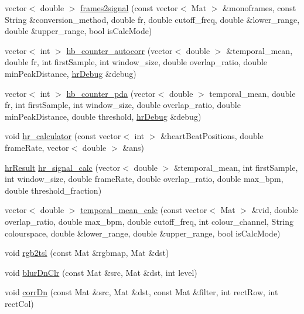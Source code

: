 \begin{DoxyCompactItemize}
\item 
vector$<$ double $>$ \hyperlink{namespace_m_h_r_a53c0c282e2b27534f2726f735f9664e3}{frames2signal} (const vector$<$ Mat $>$ \&monoframes, const String \&conversion\+\_\+method, double fr, double cutoff\+\_\+freq, double \&lower\+\_\+range, double \&upper\+\_\+range, bool is\+Calc\+Mode)
\item 
vector$<$ int $>$ \hyperlink{namespace_m_h_r_a62a720e54584696fcf7e2d545ad202dc}{hb\+\_\+counter\+\_\+autocorr} (vector$<$ double $>$ \&temporal\+\_\+mean, double fr, int first\+Sample, int window\+\_\+size, double overlap\+\_\+ratio, double min\+Peak\+Distance, \hyperlink{struct_m_h_r_1_1hr_debug}{hr\+Debug} \&debug)
\item 
vector$<$ int $>$ \hyperlink{namespace_m_h_r_ac8cf9fb76b7455034653c17bc9e3ee4c}{hb\+\_\+counter\+\_\+pda} (vector$<$ double $>$ temporal\+\_\+mean, double fr, int first\+Sample, int window\+\_\+size, double overlap\+\_\+ratio, double min\+Peak\+Distance, double threshold, \hyperlink{struct_m_h_r_1_1hr_debug}{hr\+Debug} \&debug)
\item 
void \hyperlink{namespace_m_h_r_a4ba8de262585ae09cd1564fcfda5742e}{hr\+\_\+calculator} (const vector$<$ int $>$ \&heart\+Beat\+Positions, double frame\+Rate, vector$<$ double $>$ \&ans)
\item 
\hyperlink{struct_m_h_r_1_1hr_result}{hr\+Result} \hyperlink{namespace_m_h_r_ac8025fa73e928ab097c9b58525d787b1}{hr\+\_\+signal\+\_\+calc} (vector$<$ double $>$ \&temporal\+\_\+mean, int first\+Sample, int window\+\_\+size, double frame\+Rate, double overlap\+\_\+ratio, double max\+\_\+bpm, double threshold\+\_\+fraction)
\item 
vector$<$ double $>$ \hyperlink{namespace_m_h_r_a6f102a7f405b6c84ea84f4d99e3dd847}{temporal\+\_\+mean\+\_\+calc} (const vector$<$ Mat $>$ \&vid, double overlap\+\_\+ratio, double max\+\_\+bpm, double cutoff\+\_\+freq, int colour\+\_\+channel, String colourspace, double \&lower\+\_\+range, double \&upper\+\_\+range, bool is\+Calc\+Mode)
\item 
void \hyperlink{namespace_m_h_r_ae8dc1afd1e611d432d98186da1f813e5}{rgb2tsl} (const Mat \&rgbmap, Mat \&dst)
\item 
void \hyperlink{namespace_m_h_r_a357c28865a17017a73d0f4ae8c4f7480}{blur\+Dn\+Clr} (const Mat \&src, Mat \&dst, int level)
\item 
void \hyperlink{namespace_m_h_r_a30571de29e1537d20abf69d19329c1bb}{corr\+Dn} (const Mat \&src, Mat \&dst, const Mat \&filter, int rect\+Row, int rect\+Col)
\item 

\end{DoxyCompactItemize}
